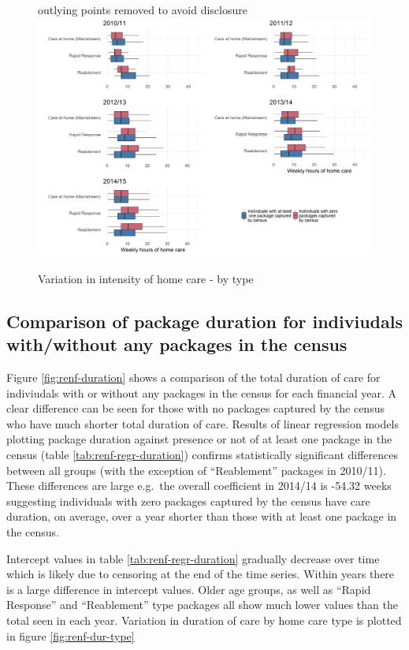 \documentclass[]{article}
\begin{document}
\begin{figure}[]
  \centering
    \caption{Variation in intensity of home care - by type}
    {\scriptsize outlying points removed to avoid disclosure}
    \includegraphics{figures/chapter-renf/16-type-inten.png}
    \label{fig:renf-intensity-type}
\end{figure}

\FloatBarrier
\subsection{Comparison of package duration for indiviudals with/without any packages in the census}\label{subsec:renf-duration-diff}

Figure \ref{fig:renf-duration} shows a comparison of the total duration
of care for indiviudals with or without any packages in the census for
each financial year. A clear difference can be seen for those with no
packages captured by the census who have much shorter total duration of
care. Results of linear regression models plotting package duration
against presence or not of at least one package in the census (table
\ref{tab:renf-regr-duration}) confirms statistically significant
differences between all groups (with the exception of ``Reablement''
packages in 2010/11). These differences are large e.g.~the overall
coefficient in 2014/14 is -54.32 weeks suggesting individuals with zero
packages captured by the census have care duration, on average, over a
year shorter than those with at least one package in the census.

Intercept values in table \ref{tab:renf-regr-duration} gradually
decrease over time which is likely due to censoring at the end of the
time series. Within years there is a large difference in intercept
values. Older age groups, as well as ``Rapid Response'' and
``Reablement'' type packages all show much lower values than the total
seen in each year. Variation in duration of care by home care type is
plotted in figure \ref{fig:renf-dur-type}
\end{document}
